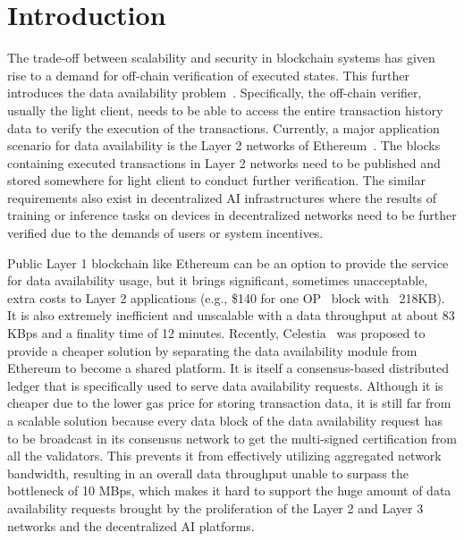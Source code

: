 \section{Introduction}

The trade-off between scalability and security in blockchain systems has given rise to a demand for off-chain verification of executed states. This further introduces the data availability problem~\cite{da}. Specifically, the off-chain verifier, usually the light client, needs to be able to access the entire transaction history data to verify the execution of the transactions. 
Currently, a major application scenario for data availability is the Layer 2 networks of Ethereum~\cite{Ethereum}. The blocks containing executed transactions in Layer 2 networks need to be published and stored somewhere for light client to conduct further verification. The similar requirements also exist in decentralized AI infrastructures where the results of training or inference tasks on devices in decentralized networks need to be further verified due to the demands of users or system incentives. 

Public Layer 1 blockchain like Ethereum can be an option to provide the service for data availability usage, but it brings significant, sometimes unacceptable, extra costs to Layer 2 applications (e.g., \$140 for one OP~\cite{op} block with ~218KB). It is also extremely inefficient and unscalable with a data throughput at about 83 KBps and a finality time of 12 minutes. Recently, Celestia~\cite{celestia} was proposed to provide a cheaper solution by separating the data availability module from Ethereum to become a shared platform. It is itself a consensus-based distributed ledger that is specifically used to serve data availability requests. Although it is cheaper due to the lower gas price for storing transaction data, it is still far from a scalable solution because every data block of the data availability request has to be broadcast in its consensus network to get the multi-signed certification from all the validators. This prevents it from effectively utilizing aggregated network bandwidth, resulting in an overall data throughput unable to surpass the bottleneck of 10 MBps, which makes it hard to support the huge amount of data availability requests brought by the proliferation of the Layer 2 and Layer 3 networks and the decentralized AI platforms.

